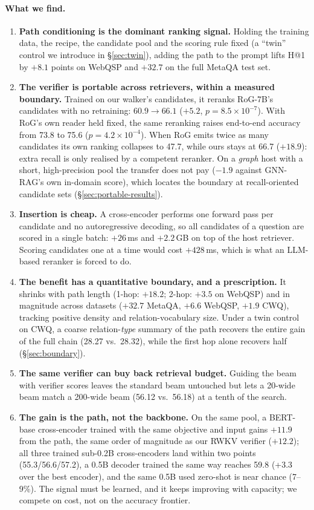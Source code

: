 \documentclass[sigconf,review,anonymous]{acmart}
\begin{document}
\paragraph{What we find.}
\begin{enumerate}
\item \textbf{Path conditioning is the dominant ranking signal.} Holding the training data, the recipe, the candidate pool and the scoring rule fixed (a ``twin'' control we introduce in \S\ref{sec:twin}), adding the path to the prompt lifts H@1 by $+8.1$ points on WebQSP and $+32.7$ on the full MetaQA test set.
\item \textbf{The verifier is portable across retrievers, within a measured boundary.} Trained on our walker's candidates, it reranks RoG-7B's candidates with no retraining: $60.9\to66.1$ ($+5.2$, $p=8.5\times10^{-7}$). With RoG's own reader held fixed, the same reranking raises end-to-end accuracy from 73.8 to 75.6 ($p=4.2\times10^{-4}$). When RoG emits twice as many candidates its own ranking collapses to 47.7, while ours stays at 66.7 ($+18.9$): extra recall is only realised by a competent reranker. On a \emph{graph} host with a short, high-precision pool the transfer does not pay ($-1.9$ against GNN-RAG's own in-domain score), which locates the boundary at recall-oriented candidate sets (\S\ref{sec:portable-results}).
\item \textbf{Insertion is cheap.} A cross-encoder performs one forward pass per candidate and no autoregressive decoding, so all candidates of a question are scored in a single batch: $+26$\,ms and $+2.2$\,GB on top of the host retriever. Scoring candidates one at a time would cost $+428$\,ms, which is what an LLM-based reranker is forced to do.
\item \textbf{The benefit has a quantitative boundary, and a prescription.} It shrinks with path length (1-hop: $+18.2$; 2-hop: $+3.5$ on WebQSP) and in magnitude across datasets ($+32.7$ MetaQA, $+6.6$ WebQSP, $+1.9$ CWQ), tracking positive density and relation-vocabulary size. Under a twin control on CWQ, a coarse relation-\emph{type} summary of the path recovers the entire gain of the full chain (28.27 vs.\ 28.32), while the first hop alone recovers half (\S\ref{sec:boundary}).
\item \textbf{The same verifier can buy back retrieval budget.} Guiding the beam with verifier scores leaves the standard beam untouched but lets a 20-wide beam match a 200-wide beam (56.12 vs.\ 56.18) at a tenth of the search.
\item \textbf{The gain is the path, not the backbone.} On the same pool, a BERT-base cross-encoder trained with the same objective and input gains $+11.9$ from the path, the same order of magnitude as our RWKV verifier ($+12.2$); all three trained sub-0.2B cross-encoders land within two points (55.3/56.6/57.2), a 0.5B decoder trained the same way reaches 59.8 (+3.3 over the best encoder), and the same 0.5B used zero-shot is near chance (7--9\%). The signal must be learned, and it keeps improving with capacity; we compete on cost, not on the accuracy frontier.
\end{enumerate}
\end{document}
